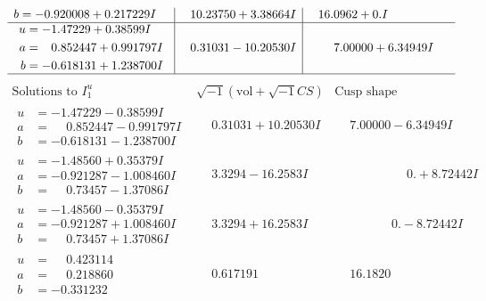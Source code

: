 \documentclass[1p]{elsarticle_modified}
\theoremstyle{definition}
\newcommand{\I}{\sqrt{-1}}
\begin{document}
$$\begin{array}{c|c|c}
\begin{aligned}
b &= -0.920008 + 0.217229 I\end{aligned}
 & \phantom{-}10.23750 + 3.38664 I & \phantom{-}16.0962 + 0. I\phantom{ +0.000000I} \\ \hline\begin{aligned}
u &= -1.47229 + 0.38599 I \\
a &= \phantom{-}0.852447 + 0.991797 I \\
b &= -0.618131 + 1.238700 I\end{aligned}
 & \phantom{-}0.31031 - 10.20530 I & \phantom{-}7.00000 + 6.34949 I\\
 \hline 
 \end{array}$$\newpage$$\begin{array}{c|c|c}  
\text{Solutions to }I^u_{1}& \I (\text{vol} + \sqrt{-1}CS) & \text{Cusp shape}\\
 \hline 
\begin{aligned}
u &= -1.47229 - 0.38599 I \\
a &= \phantom{-}0.852447 - 0.991797 I \\
b &= -0.618131 - 1.238700 I\end{aligned}
 & \phantom{-}0.31031 + 10.20530 I & \phantom{-}7.00000 - 6.34949 I \\ \hline\begin{aligned}
u &= -1.48560 + 0.35379 I \\
a &= -0.921287 - 1.008460 I \\
b &= \phantom{-}0.73457 - 1.37086 I\end{aligned}
 & \phantom{-}3.3294 - 16.2583 I & \phantom{-0.000000 -}0. + 8.72442 I \\ \hline\begin{aligned}
u &= -1.48560 - 0.35379 I \\
a &= -0.921287 + 1.008460 I \\
b &= \phantom{-}0.73457 + 1.37086 I\end{aligned}
 & \phantom{-}3.3294 + 16.2583 I & \phantom{-0.000000 } 0. - 8.72442 I \\ \hline\begin{aligned}
u &= \phantom{-}0.423114\phantom{ +0.000000I} \\
a &= \phantom{-}0.218860\phantom{ +0.000000I} \\
b &= -0.331232\phantom{ +0.000000I}\end{aligned}
 & \phantom{-}0.617191\phantom{ +0.000000I} & \phantom{-}16.1820\phantom{ +0.000000I} \\ \hline\begin{aligned}

\end{aligned}
\end{array}$$
\end{document}
